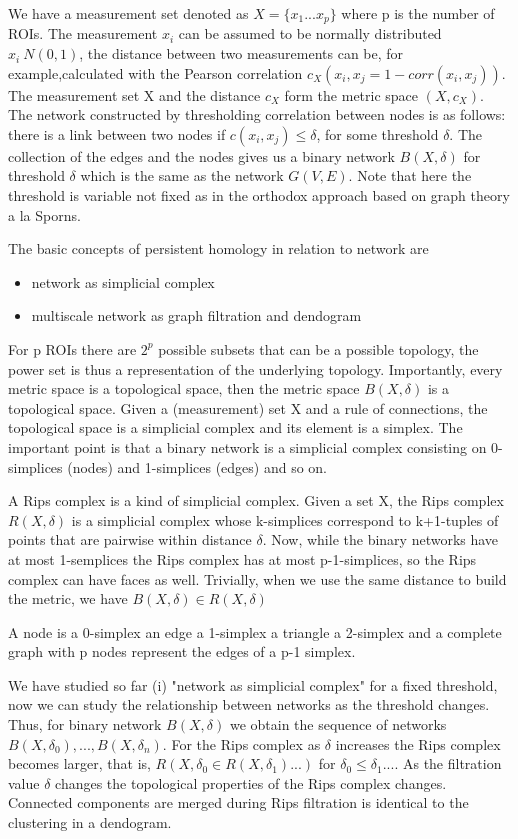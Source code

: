 \documentclass[onecollarge,runningheads]{svjour2}
\begin{document}
We have a measurement set denoted as $X= \{ x_1 ... x_p\}$ where p is the number of ROIs. The measurement $x_i$ can be assumed to be normally distributed $x_i ~ N(0,1)$, the distance between two measurements can be, for example,calculated with the Pearson correlation $c_{X}(x_i,x_j= 1 - corr(x_i,x_j))$. 
The measurement set X and the distance $c_X$ form the metric space $(X,c_X)$. The network constructed by thresholding correlation between nodes is as follows:
there is a link between two nodes if $c(x_i,x_j) \leq \delta$, for some threshold $\delta$. The collection of the edges and the nodes gives us a binary network $B(X,\delta)$ for threshold $\delta$ which is the same as the network $G(V,E)$. Note that here the threshold is variable not fixed as in the orthodox approach based on graph theory a la Sporns.

The basic concepts of persistent homology in relation to network are
\begin{itemize}
\item network as simplicial complex
\item multiscale network as graph filtration and dendogram 
\end{itemize}

For p ROIs there are $2^p$ possible subsets that can be a possible topology, the power set is thus a representation of the underlying topology.
Importantly, every metric space is a topological space, then the metric space $B(X, \delta)$ is a topological space. 
Given a (measurement) set X and a rule of connections, the topological space is a simplicial complex and its element is a simplex. %
The important point is that a binary network is a simplicial complex consisting on 0-simplices (nodes) and 1-simplices (edges) and so on.

A Rips complex is a kind of simplicial complex. Given a set X, the Rips complex $R(X,\delta)$ is a simplicial complex whose k-simplices correspond to k+1-tuples of points that are pairwise within distance $\delta$. 
Now, while the binary networks have at most 1-semplices the Rips complex has at most p-1-simplices, so the Rips complex can have faces as well. Trivially, when we use the same distance to build the metric, we have $B(X,\delta) \in R(X,\delta)$

A node is a 0-simplex an edge a 1-simplex a triangle a 2-simplex and a complete graph with p nodes represent the edges of a p-1 simplex.

We have studied so far (i) "network as simplicial complex" for a fixed threshold, now we can study the relationship between networks as the threshold changes. Thus, for  binary network $B(X,\delta)$ we obtain the sequence of networks $B(X,\delta_0), ...,B(X,\delta_n)$. For the Rips complex as $\delta$ increases the Rips complex becomes larger, that is, $R(X,\delta_0 \in R(X,\delta_1) ...)$ for $\delta_0 \leq \delta_1 ...$. As the filtration value $\delta$ changes the topological properties of the Rips complex changes. Connected components are merged during Rips filtration is identical to the clustering in a dendogram.
\end{document}
